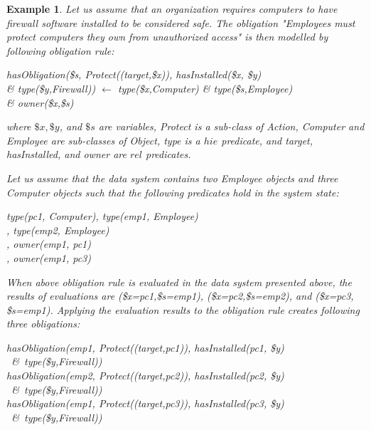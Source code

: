 \documentclass[12pt,journal,letterpaper,onecolumn]{IEEEtran}
\newtheorem{example}{Example}[section]
\begin{document}
\begin{example}  Let us assume that an organization requires
computers to have firewall software installed to be considered safe.
The obligation "Employees must protect computers they own from
unauthorized access" is then modelled by following obligation rule:

{\ttfamily hasObligation(\$s, Protect((target,\$x))},
{\ttfamily hasInstalled(\$x, \$y)} \\
{\ttfamily\&} {\ttfamily type(\$y,Firewall))}
 $\leftarrow$ {\ttfamily type(\$x,Computer)} {\ttfamily \&}
{\ttfamily type(\$s,Employee) \\ {\ttfamily \&} owner(\$x,\$s)}

where $\$x, \$y$, and $\$s$ are variables, {\ttfamily Protect} is a
sub-class of {\ttfamily Action}, {\ttfamily Computer} and {\ttfamily
Employee} are sub-classes of {\ttfamily Object}, {\ttfamily type} is
a $hie$ predicate, and {\ttfamily target}, {\ttfamily hasInstalled},
and {\ttfamily owner} are $rel$ predicates.

Let us assume that the data system contains two Employee objects and
three Computer objects such that the following predicates hold in
the system state:

{\ttfamily type(pc1, Computer)}, {\ttfamily type(emp1, Employee)}\\
, {\ttfamily type(emp2, Employee)}\\
, {\ttfamily owner(emp1, pc1)}\\
, {\ttfamily owner(emp1, pc3)}

When above obligation rule is evaluated in the data system presented
above, the results of evaluations are {\ttfamily
(\$x=pc1,\$s=emp1)}, {\ttfamily (\$x=pc2,\$s=emp2)}, and {\ttfamily
(\$x=pc3, \$s=emp1)}. Applying the evaluation results to the
obligation rule creates following three obligations:

\noindent
{\ttfamily hasObligation(emp1, Protect((target,pc1)), hasInstalled(pc1, \$y) \\ \indent ~\&~type(\$y,Firewall))} \\
{\ttfamily hasObligation(emp2, Protect((target,pc2)), hasInstalled(pc2, \$y) \\ \indent ~\&~type(\$y,Firewall))} \\
{\ttfamily hasObligation(emp1, Protect((target,pc3)), hasInstalled(pc3, \$y) \\ \indent  ~\&~type(\$y,Firewall))} \\
\end{example}
\end{document}
